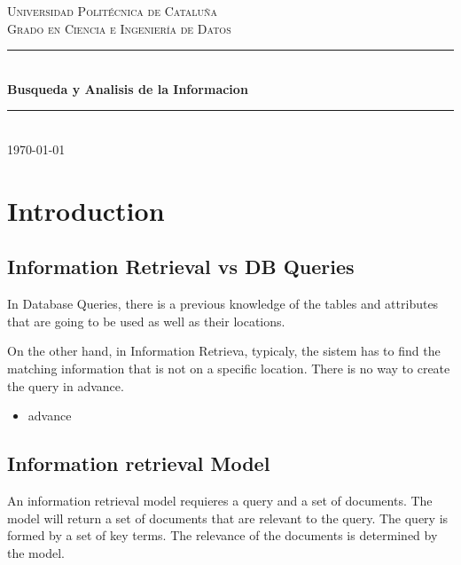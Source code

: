 \documentclass{article}
\begin{document}
\begin{titlepage}
    \newcommand{\HRule}{\rule{\linewidth}{0.5mm}}
    
    \center %
    \textsc{\LARGE Universidad Politécnica de Cataluña}\\[1.5cm]
    \textsc{\Large Grado en Ciencia e Ingeniería de Datos}\\[0.5cm]
    \HRule\\[0.4cm]
    {\huge\bfseries Busqueda y Analisis de la Informacion}\\[0.4cm]
    \HRule\\[1.5cm]
    \vfill
    {\large\today}
\end{titlepage}

\newpage
\tableofcontents
\newpage

\fancyfoot{} %

\section{Introduction}

\subsection{Information Retrieval vs DB Queries}
In Database Queries, there is a previous knowledge of the tables and attributes that are going to be used as well as their locations.

On the other hand, in Information Retrieva, typicaly, the sistem has to find the matching information that is not on a specific location. There is no way to create the query in advance.

\begin{itemize}
    \item advance
\end{itemize}

\subsection{Information retrieval Model}
An information retrieval model requieres a query and a set of documents. The model will return a set of documents that are relevant to the query. The query is formed by a set of key terms. The relevance of the documents is determined by the model.
\end{document}
